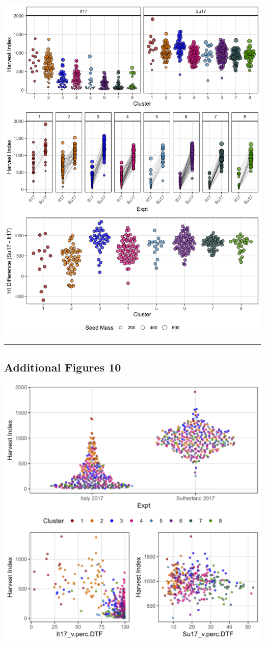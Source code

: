 \documentclass[
]{article}
\begin{document}
\includegraphics{Additional/Additional_Figure_09.png}

\begin{center}\rule{0.5\linewidth}{0.5pt}\end{center}

\subsection{Additional Figures 10}\label{additional-figures-10}

\includegraphics{Additional/Additional_Figure_10.png}
\end{document}
